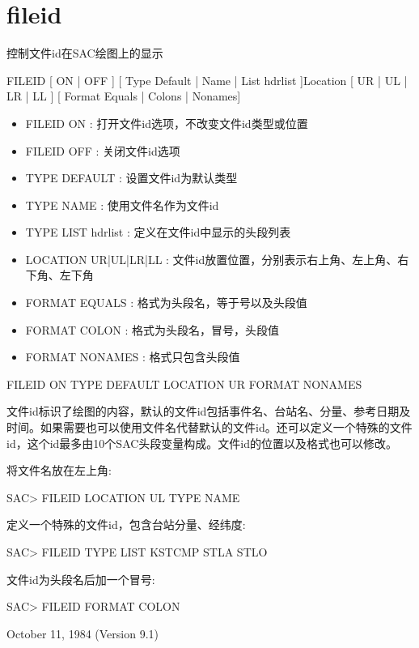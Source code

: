 \section{fileid}
\label{cmd:fileid}

控制文件id在SAC绘图上的显示

FILEID [ ON | OFF ] [ Type Default | Name | List hdrlist ]Location [ UR | UL | LR | LL ] [ Format Equals | Colons | Nonames]

\begin{itemize}
\item FILEID ON : 打开文件id选项，不改变文件id类型或位置 
\item FILEID OFF : 关闭文件id选项 
\item TYPE DEFAULT : 设置文件id为默认类型 
\item TYPE NAME : 使用文件名作为文件id 
\item TYPE LIST hdrlist : 定义在文件id中显示的头段列表 
\item LOCATION UR|UL|LR|LL : 文件id放置位置，分别表示右上角、左上角、右下角、左下角
\item FORMAT EQUALS : 格式为头段名，等于号以及头段值 
\item FORMAT COLON : 格式为头段名，冒号，头段值 
\item FORMAT NONAMES : 格式只包含头段值 
\end{itemize}

FILEID ON TYPE DEFAULT LOCATION UR FORMAT NONAMES

文件id标识了绘图的内容，默认的文件id包括事件名、台站名、分量、参考日期及时间。如果需要也可以使用文件名代替默认的文件id。还可以定义一个特殊的文件id，这个id最多由10个SAC头段变量构成。文件id的位置以及格式也可以修改。

将文件名放在左上角:
\begin{SACCode}
SAC> FILEID LOCATION UL TYPE NAME
\end{SACCode}

定义一个特殊的文件id，包含台站分量、经纬度:
\begin{SACCode}
SAC> FILEID TYPE LIST KSTCMP STLA STLO
\end{SACCode}

文件id为头段名后加一个冒号:
\begin{SACCode}
SAC> FILEID FORMAT COLON
\end{SACCode}

October 11, 1984 (Version 9.1)
